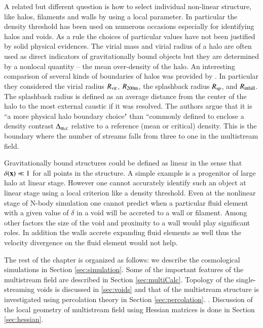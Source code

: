 A related but different question is how to select individual non-linear structure, like halos, filaments and walls by using a local parameter. In particular the density threshold has been  used on numerous occasions especially for identifying halos and voids. As a rule the choices of particular values have not been justified by solid physical evidences. The virial mass and virial radius of a halo are often used as direct indicators of gravitationally bound objects but they are  determined  by a nonlocal quantity -- the mean over-density of the halo. 
An interesting comparison of several kinds of boundaries of halos was provided by \cite{More2015}. In particular they considered  the virial radius $R_{\rm vir}$,  $R_{\rm  200m}$,  the splashback radius $R_{\rm sp}$, and $R_{\rm infall}$. The splashback
radius is defined as an average distance from the center of the halo to the most external caustic if it was resolved. The authors argue
that it is ``a more physical halo boundary choice" than ``commonly defined to enclose a density contrast $\Delta_{\rm m,c}$ relative to 
a reference (mean or critical) density.
This is the boundary where the number of streams falls from three to one in the multistream field.

Gravitationally bound structures could be defined as linear in the sense  that $\delta({\bf x}) \ll 1$ for all points in the structure. A simple example is a progenitor of large halo at linear stage. However  one cannot accurately identify such an object at linear
stage using a local criterion like a density threshold. Even at the nonlinear stage of N-body simulation one cannot predict 
when a particular fluid element with a given value of $\delta$ in a void will be accreted to a wall or filament. Among other factors 
the size of the void and proximity to a wall would play significant roles.  In addition the walls accrete expanding fluid elements
as well thus the velocity divergence on the fluid element would not help.


The rest of the chapter is organized as follows: we describe the cosmological simulations in Section \ref{sec:simulation}. Some of the important features of the multistream field are described in Section \ref{sec:multiCalc}. Topology of the single-streaming voids is discussed in \ref{sec:voids} and that of the multistream structure is investigated using percolation theory in Section \ref{sec:percolation}. . Discussion of the local geometry of multistream field using Hessian matrices is done in Section \ref{sec:hessian}. 


